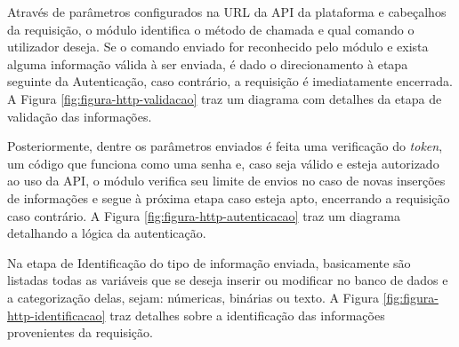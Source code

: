     	 Através de parâmetros configurados na \gls{URL} da \gls{API} da plataforma e cabeçalhos da requisição, o módulo identifica o método de chamada e qual comando o utilizador deseja. Se o comando enviado for reconhecido pelo módulo e exista alguma informação válida à ser enviada, é dado o direcionamento à etapa seguinte da Autenticação, caso contrário, a requisição é imediatamente encerrada. A Figura \ref{fig:figura-http-validacao} traz um diagrama com detalhes da etapa de validação das informações.
    	 
    	 Posteriormente, dentre os parâmetros enviados é feita uma verificação do \textit{token}, um código que funciona como uma senha e, caso seja válido e esteja autorizado ao uso da \gls{API}, o módulo verifica seu limite de envios no caso de novas inserções de informações e segue à próxima etapa caso esteja apto, encerrando a requisição caso contrário. A Figura \ref{fig:figura-http-autenticacao} traz um diagrama detalhando a lógica da autenticação.
    	
    	\begin{figure}[!h]
    	\end{figure}
    	
    	 Na etapa de Identificação do tipo de informação enviada, basicamente são listadas todas as variáveis que se deseja inserir ou modificar no banco de dados e a categorização delas, sejam: númericas, binárias ou texto. A Figura \ref{fig:figura-http-identificacao} traz detalhes sobre a identificação das informações provenientes da requisição.
    	
    	\begin{figure}[!h]
    	\end{figure}
    	
